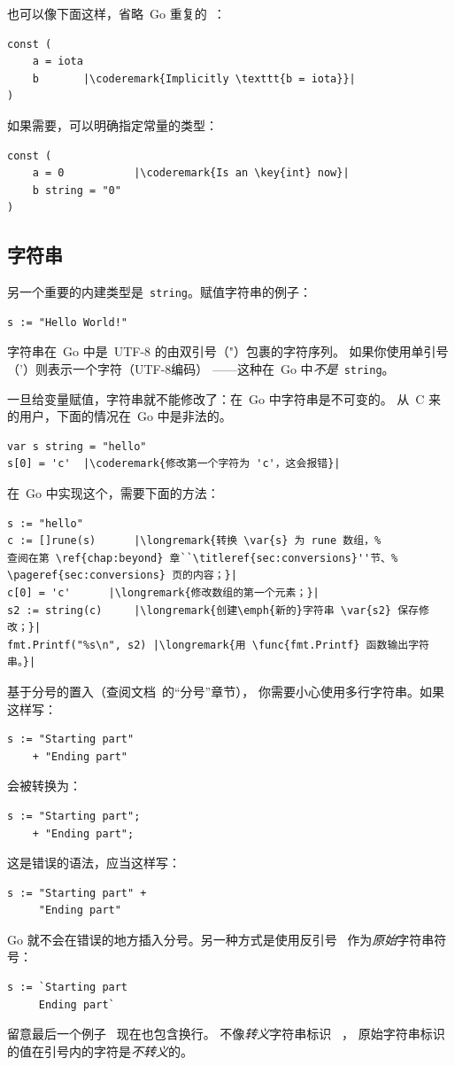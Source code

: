 也可以像下面这样，省略~Go 重复的~：
\begin{lstlisting}
const (
	a = iota
	b	    |\coderemark{Implicitly \texttt{b = iota}}|
)
\end{lstlisting}
如果需要，可以明确指定常量的类型：
\begin{lstlisting}
const (
	a = 0           |\coderemark{Is an \key{int} now}|
	b string = "0" 
)
\end{lstlisting}

\subsection{字符串}
另一个重要的内建类型是~\lstinline{string}。赋值字符串的例子：
\begin{lstlisting}
s := "Hello World!"
\end{lstlisting}
字符串在~Go 中是~UTF-8 的由双引号（"）包裹的字符序列。
如果你使用单引号（'）则表示一个字符（UTF-8编码）
——这种在~Go 中\emph{不是}~\lstinline{string}。

一旦给变量赋值，字符串就不能修改了：在~Go 中字符串是不可变的。
从~C 来的用户，下面的情况在~Go 中是非法的。
\begin{lstlisting}
var s string = "hello"
s[0] = 'c'  |\coderemark{修改第一个字符为 'c'，这会报错}|
\end{lstlisting}
在~Go 中实现这个，需要下面的方法：
\begin{lstlisting}
s := "hello"
c := []rune(s)	    |\longremark{转换 \var{s} 为 rune 数组，%
查阅在第 \ref{chap:beyond} 章``\titleref{sec:conversions}''节、%
\pageref{sec:conversions} 页的内容；}|
c[0] = 'c'	    |\longremark{修改数组的第一个元素；}|
s2 := string(c)     |\longremark{创建\emph{新的}字符串 \var{s2} 保存修改；}|
fmt.Printf("%s\n", s2) |\longremark{用 \func{fmt.Printf} 函数输出字符串。}|
\end{lstlisting}
\showremarks

\begin{lbar}[多行字符串]
基于分号的置入（查阅文档~\cite{effective_go}的``分号''章节），
你需要小心使用多行字符串。如果这样写：
\begin{lstlisting}
s := "Starting part"
    + "Ending part"
\end{lstlisting}
会被转换为：
\begin{lstlisting}
s := "Starting part";
    + "Ending part";
\end{lstlisting}
这是错误的语法，应当这样写：
\begin{lstlisting}
s := "Starting part" +
     "Ending part"
\end{lstlisting}
Go 就不会在错误的地方插入分号。另一种方式是使用反引号~ 作为\emph{原始}字符串符号：
\begin{lstlisting}
s := `Starting part
     Ending part`
\end{lstlisting}
留意最后一个例子~ 现在也包含换行。
不像\emph{转义}字符串标识~ ，
原始字符串标识的值在引号内的字符是\emph{不转义}的。
\end{lbar}


